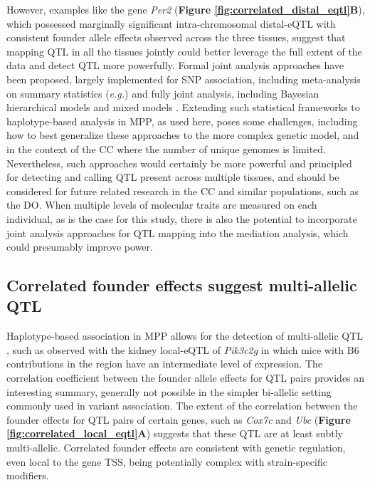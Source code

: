 \documentclass[9pt,twocolumn,twoside]{gsajnl}
\newcommand{\eg}{\emph{e.g.}}
\begin{document}
However, examples like the gene \textit{Per2} (\textbf{Figure \ref{fig:correlated_distal_eqtl}B}), which possessed marginally significant intra-chromosomal distal-eQTL with consistent founder allele effects observed across the three tissues, suggest that mapping QTL in all the tissues jointly could better leverage the full extent of the data and detect QTL more powerfully. Formal joint analysis approaches have been proposed, largely implemented for SNP association, including meta-analysis on summary statistics (\eg \citealt{Fu2012a, Sul2013}) and fully joint analysis, including Bayesian hierarchical models \citep{Flutre2013} and mixed models \citep{Acharya2016}. Extending such statistical frameworks to haplotype-based analysis in MPP, as used here, poses some challenges, including how to best generalize these approaches to the more complex genetic model, and in the context of the CC where the number of unique genomes is limited. Nevertheless, such approaches would certainly be more powerful and principled for detecting and calling QTL present across multiple tissues, and should be considered for future related research in the CC and similar populations, such as the DO. When multiple levels of molecular traits are measured on each individual, as is the case for this study, there is also the potential to incorporate joint analysis approaches for QTL mapping into the mediation analysis, which could presumably improve power.

\subsection{Correlated founder effects suggest multi-allelic QTL}

Haplotype-based association in MPP allows for the detection of multi-allelic QTL \citep{Aylor2011}, such as observed with the kidney local-eQTL of \textit{Pik3c2g} in which mice with B6 contributions in the region have an intermediate level of expression. The correlation coefficient between the founder allele effects for QTL pairs provides an interesting summary, generally not possible in the simpler bi-allelic setting commonly used in variant association. The extent of the correlation between the founder effects for QTL pairs of certain genes, such as \textit{Cox7c} and \textit{Ubc} (\textbf{Figure \ref{fig:correlated_local_eqtl}A}) suggests that these QTL are at least subtly multi-allelic. Correlated founder effects are consistent with genetic regulation, even local to the gene TSS, being potentially complex with strain-specific modifiers.
\end{document}
